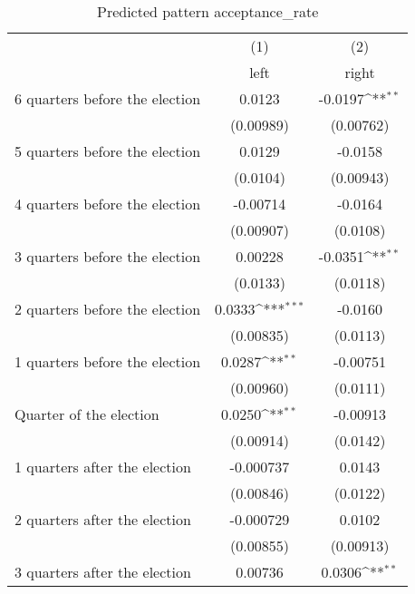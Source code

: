 \begin{table}[htbp]\centering
\def\sym#1{\ifmmode^{#1}\else\(^{#1}\)\fi}
\caption{Predicted pattern acceptance\_rate}
\begin{tabular}{l*{2}{c}}
\hline\hline
                    &\multicolumn{1}{c}{(1)}&\multicolumn{1}{c}{(2)}\\
                    &\multicolumn{1}{c}{left}&\multicolumn{1}{c}{right}\\
\hline
 6 quarters before the election&      0.0123         &     -0.0197\sym{**} \\
                    &   (0.00989)         &   (0.00762)         \\
[1em]
 5 quarters before the election&      0.0129         &     -0.0158         \\
                    &    (0.0104)         &   (0.00943)         \\
[1em]
 4 quarters before the election&    -0.00714         &     -0.0164         \\
                    &   (0.00907)         &    (0.0108)         \\
[1em]
 3 quarters before the election&     0.00228         &     -0.0351\sym{**} \\
                    &    (0.0133)         &    (0.0118)         \\
[1em]
 2 quarters before the election&      0.0333\sym{***}&     -0.0160         \\
                    &   (0.00835)         &    (0.0113)         \\
[1em]
 1 quarters before the election&      0.0287\sym{**} &    -0.00751         \\
                    &   (0.00960)         &    (0.0111)         \\
[1em]
Quarter of the election&      0.0250\sym{**} &    -0.00913         \\
                    &   (0.00914)         &    (0.0142)         \\
[1em]
 1 quarters after the election&   -0.000737         &      0.0143         \\
                    &   (0.00846)         &    (0.0122)         \\
[1em]
 2 quarters after the election&   -0.000729         &      0.0102         \\
                    &   (0.00855)         &   (0.00913)         \\
[1em]
 3 quarters after the election&     0.00736         &      0.0306\sym{**} \\

\end{tabular}
\end{table}
